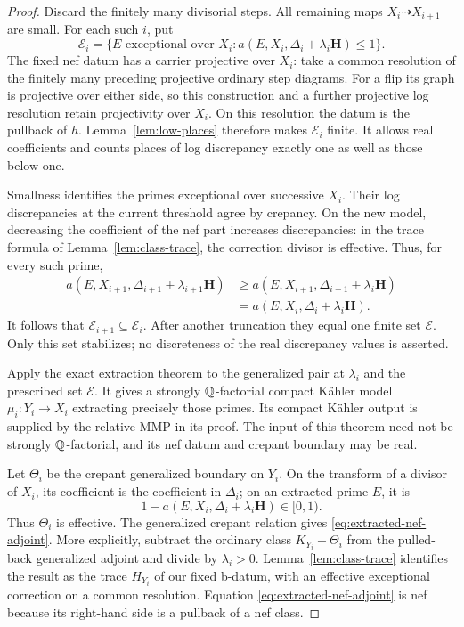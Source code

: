 \begin{proof}
Discard the finitely many divisorial steps.  All remaining maps
\(X_i\dashrightarrow X_{i+1}\) are small.  For each such \(i\), put
\[
 \mathcal E_i=\{E\text{ exceptional over }X_i:
      a(E,X_i,\Delta_i+\lambda_i\mathbf H)\leq1\}.
\]
The fixed nef datum has a carrier projective over \(X_i\): take a
common resolution of the finitely many preceding projective ordinary
step diagrams.  For a flip its graph is projective over either side,
so this construction and a further projective log resolution retain
projectivity over \(X_i\).  On this resolution the datum is the
pullback of \(h\).  Lemma~\ref{lem:low-places} therefore makes
\(\mathcal E_i\) finite.  It allows real coefficients and counts
places of log discrepancy exactly one as well as those below one.

Smallness identifies the primes exceptional over successive
\(X_i\).  Their log discrepancies at the current threshold agree by
crepancy.  On the new model, decreasing the coefficient of the nef
part increases discrepancies: in the trace formula of
Lemma~\ref{lem:class-trace}, the correction divisor is effective.
Thus, for every such prime,
\begin{equation}\label{eq:decreasing-extraction-sets}
 \begin{split}
 a(E,X_{i+1},\Delta_{i+1}+\lambda_{i+1}\mathbf H)
 &\geq a(E,X_{i+1},\Delta_{i+1}+\lambda_i\mathbf H)\\
 &=a(E,X_i,\Delta_i+\lambda_i\mathbf H).
 \end{split}
\end{equation}
It follows that \(\mathcal E_{i+1}\subseteq\mathcal E_i\).
After another truncation they equal one finite set \(\mathcal E\).
Only this set stabilizes; no discreteness of the real discrepancy
values is asserted.

Apply the exact extraction theorem
\cite[Corollary~2.29]{HX2026} to the generalized pair at
\(\lambda_i\) and the prescribed set \(\mathcal E\).
It gives a strongly \(\mathbb Q\)-factorial compact Kähler model
\(\mu_i:Y_i\to X_i\) extracting precisely those primes.
Its compact Kähler output is supplied by the relative MMP in its proof.
The input of this theorem need not be
strongly \(\mathbb Q\)-factorial, and its nef datum and crepant boundary
may be real.

Let \(\Theta_i\) be the crepant generalized boundary on \(Y_i\).
On the transform of a divisor of \(X_i\), its coefficient is the
coefficient in \(\Delta_i\); on an extracted prime \(E\), it is
\[
 1-a(E,X_i,\Delta_i+\lambda_i\mathbf H)\in[0,1).
\]
Thus \(\Theta_i\) is effective.  The generalized crepant relation
gives \eqref{eq:extracted-nef-adjoint}.  More explicitly, subtract
the ordinary class \(K_{Y_i}+\Theta_i\) from the pulled-back
generalized adjoint and divide by \(\lambda_i>0\).
Lemma~\ref{lem:class-trace} identifies the result as the trace
\(H_{Y_i}\) of our fixed b-datum, with an effective exceptional
correction on a common resolution.  Equation
\eqref{eq:extracted-nef-adjoint} is nef because its right-hand side
is a pullback of a nef class.


\end{proof}
